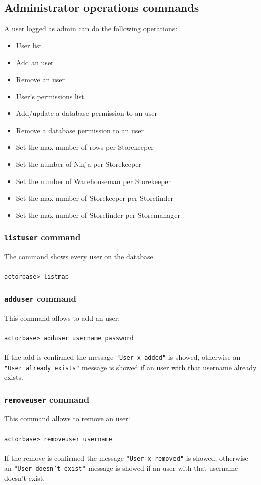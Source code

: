 \documentclass[a4paper]{article}
\begin{document}
	\subsection{Administrator operations commands}
	A user logged as admin can do the following operations:
	\begin{itemize}
		\item User list
		\item Add an user
		\item Remove an user
		\item User's permissions list
		\item Add/update a database permission to an user
		\item Remove a database permission to an user
		\item Set the max number of rows per Storekeeper
		\item Set the number of Ninja per Storekeeper
		\item Set the number of Warehouseman per Storekeeper
		\item Set the max number of Storekeeper per Storefinder
		\item Set the max number of Storefinder per Storemanager
	\end{itemize}

	\subsubsection{\texttt{listuser} command}
	The command shows every user on the database.
	\\ \\
	\texttt{actorbase>	listmap}

	\subsubsection{\texttt{adduser} command}
	This command allows to add an user:
	\\ \\
	\texttt{actorbase>	adduser username password}
	\\ \\
	If the add is confirmed the message \texttt{"User x added"} is showed, otherwise an \texttt{"User already exists"} message is showed if an user with that username already exists.

	\subsubsection{\texttt{removeuser} command}
	This command allows to remove an user:
	\\ \\
	\texttt{actorbase>	removeuser username}
	\\ \\
	If the remove is confirmed the message \texttt{"User x removed"} is showed, otherwise an \texttt{"User doesn't exist"} message is showed if an user with that username doesn't exist.
	
\end{document}
